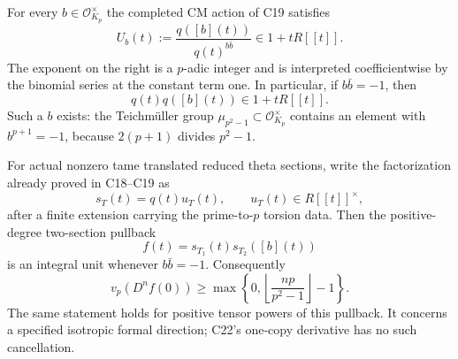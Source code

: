 \documentclass[11pt]{article}
\theoremstyle{definition}\newtheorem{definition}[theorem]{Definition}\newtheorem{remark}[theorem]{Remark}
\begin{document}
For every $b\in\mathcal O_{K_p}^{\times}$ the completed CM
action of C19 satisfies
\begin{equation}\label{C26-unit-isogeny}
 U_b(t):=\frac{q([b](t))}{q(t)^{b\bar b}}
           \in1+tR[[t]].
\end{equation}
The exponent on the right is a $p$-adic integer and is interpreted
coefficientwise by the binomial series at the constant term one.
In particular, if $b\bar b=-1$, then
\begin{equation}\label{C26-two-copy-unit}
                  q(t)q([b](t))\in1+tR[[t]].
\end{equation}
Such a $b$ exists: the Teichm\"uller group
$\mu_{p^2-1}\subset\mathcal O_{K_p}^{\times}$ contains an element
with $b^{p+1}=-1$, because $2(p+1)$ divides $p^2-1$.

For actual nonzero tame translated reduced theta sections, write the
factorization already proved in C18--C19 as
\[
 s_T(t)=q(t)u_T(t),\qquad u_T(t)\in R[[t]]^{\times},
\]
after a finite extension carrying the prime-to-$p$ torsion data.
Then the positive-degree two-section pullback
\begin{equation}\label{C26-theta-pullback}
                 f(t)=s_{T_1}(t)s_{T_2}([b](t))
\end{equation}
is an integral unit whenever $b\bar b=-1$.
Consequently
\begin{equation}\label{C26-strong}
 v_p(D^nf(0))\geq
     \max\left\{0,\left\lfloor\frac{np}{p^2-1}\right\rfloor-1\right\}.
\end{equation}
The same statement holds for positive tensor powers of this
pullback.  It concerns a specified isotropic formal direction;
C22's one-copy derivative has no such cancellation.
\end{document}
